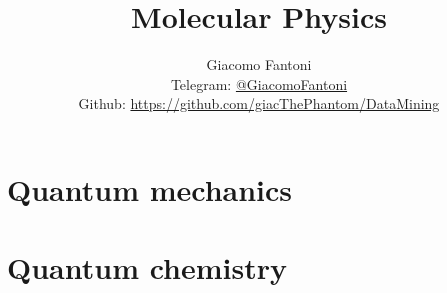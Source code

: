 

\title{\Huge \textbf{Molecular Physics}}

\author{
  Giacomo Fantoni \\
  \small Telegram: \href{https://t.me/GiacomoFantoni}{@GiacomoFantoni} \\[3pt]
  \small Github: \href{https://github.com/giacThePhantom/DataMining}{https://github.com/giacThePhantom/DataMining}}

\maketitle
\tableofcontents

  \part{Quantum mechanics}

  

  \part{Quantum chemistry}

\begin{appendices}

  
  
  
  
  
  

\end{appendices}



